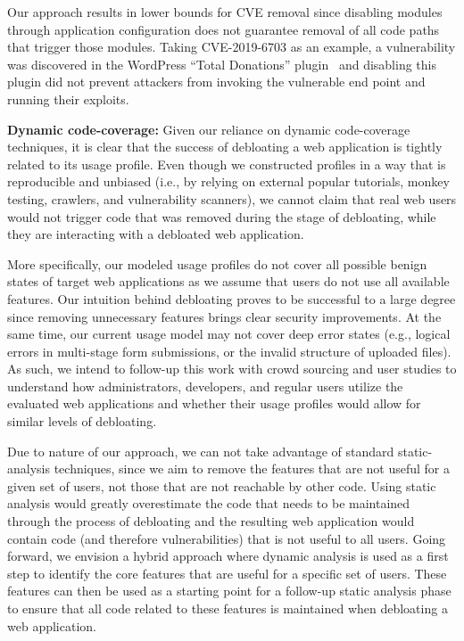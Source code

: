 Our approach results in lower bounds for CVE removal since disabling modules through application configuration does not guarantee removal of all code paths that trigger those modules. Taking CVE-2019-6703 as an example, a vulnerability was discovered in the WordPress ``Total Donations'' plugin~\cite{wordpressPlugin} and disabling this plugin did not prevent attackers from invoking the vulnerable end point and running their exploits.

\vspace{1ex}
\noindent\textbf{Dynamic code-coverage:}  Given our reliance on dynamic
code-coverage techniques, it is clear that the success of debloating a web application
is tightly related to its usage profile. Even though we constructed profiles
in a way that is reproducible and unbiased (i.e., by relying on external
popular tutorials, monkey testing, crawlers, and vulnerability scanners), we cannot claim that
real web users would not trigger code that was removed during the stage of
debloating, while they are interacting with a debloated web application.

More specifically, our modeled usage profiles do not cover all possible benign states of target web applications as we assume that users do not use all available features.
Our intuition behind debloating proves to be successful to a large degree since removing unnecessary features brings clear security improvements.
At the same time, our current usage model may not cover deep error states (e.g., logical errors in multi-stage form submissions, or the invalid structure of uploaded files).
As such, we intend to follow-up this work with crowd sourcing and user studies
to understand how administrators, developers, and regular users utilize the
evaluated web applications and whether their usage profiles would allow for
similar levels of debloating.

Due to nature of our approach, we can not take advantage of standard
static-analysis techniques, since we aim to remove the features that are
not useful for a given set of users, not those that are not reachable by
other code. Using static analysis would greatly overestimate the code that
needs to be maintained through the process of debloating and the resulting
web application would contain code (and therefore vulnerabilities) that is
not useful to all users. Going forward, we envision a hybrid approach where
dynamic analysis is used as a first step to identify the core features that
are useful for a specific set of users. These features can then be used as
a starting point for a follow-up static analysis phase to ensure that all
code related to these features is maintained when debloating a web application.

